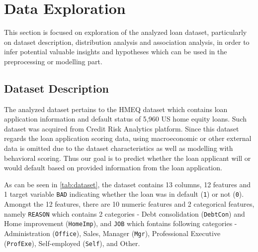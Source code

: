     \section{Data Exploration}
    This section is focused on exploration of the analyzed loan dataset, particularly on dataset description, distribution analysis and association analysis, in order to infer potential valuable insights and hypotheses which can be used in the preprocessing or modelling part.

    \subsection{Dataset Description}
    The analyzed dataset pertains to the HMEQ dataset which contains loan application information and default status of 5,960 US home equity loans. Such dataset was acquired from Credit Risk Analytics platform. Since this dataset regards the loan application scoring data, using macroeconomic or other external data is omitted due to the dataset characteristics as well as modelling with behavioral scoring.
    Thus our goal is to predict whether the loan applicant will or would default based on provided information from the loan application.

    As can be seen in \autoref{tab:dataset}, the dataset contains 13 columns, 12 features and 1 target variable \texttt{BAD} indicating whether the loan was in default (\texttt{1}) or not (\texttt{0}). 
    Amongst the 12 features, there are 10 numeric features and 2 categorical features, namely \texttt{REASON} which contains 2 categories - Debt consolidation (\texttt{DebtCon}) and Home improvement (\texttt{HomeImp}), and \texttt{JOB} which fontains following categories - Administration (\texttt{Office}), Sales, Manager (\texttt{Mgr}), Professional Executive (\texttt{ProfExe}), Self-employed (\texttt{Self}), and Other.


